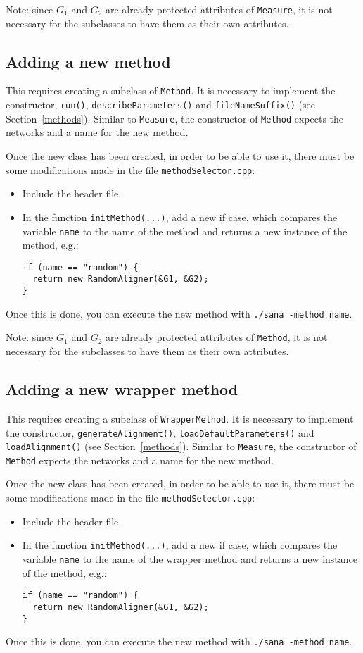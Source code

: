 \documentclass[]{article}
\begin{document}
Note: since $G_1$ and $G_2$ are already protected attributes of \texttt{Measure}, it is not necessary for the subclasses to have them as their own attributes.

\subsection{Adding a new method}
This requires creating a subclass of \texttt{Method}. It is necessary to implement the constructor, \texttt{run()}, \texttt{describeParameters()} and \texttt{fileNameSuffix()} (see Section~\ref{methods}). Similar to \texttt{Measure}, the constructor of \texttt{Method} expects the networks and a name for the new method.

Once the new class has been created, in order to be able to use it, there must be some modifications made in the file \texttt{methodSelector.cpp}:
\begin{itemize}
\item Include the header file.
\item In the function \texttt{initMethod(...)}, add a new if case, which compares the variable \texttt{name} to the name of the method and returns a new instance of the method, e.g.:
\begin{verbatim}
if (name == "random") {
  return new RandomAligner(&G1, &G2);
}
\end{verbatim}
\end{itemize}
Once this is done, you can execute the new method with \texttt{./sana -method name}.

Note: since $G_1$ and $G_2$ are already protected attributes of \texttt{Method}, it is not necessary for the subclasses to have them as their own attributes.

\subsection{Adding a new wrapper method}
This requires creating a subclass of \texttt{WrapperMethod}. It is necessary to implement the constructor, \texttt{generateAlignment()}, \texttt{loadDefaultParameters()} and \texttt{loadAlignment()} (see Section~\ref{methods}). Similar to \texttt{Measure}, the constructor of \texttt{Method} expects the networks and a name for the new method.

Once the new class has been created, in order to be able to use it, there must be some modifications made in the file \texttt{methodSelector.cpp}:
\begin{itemize}
\item Include the header file.
\item In the function \texttt{initMethod(...)}, add a new if case, which compares the variable \texttt{name} to the name of the wrapper method and returns a new instance of the method, e.g.:
\begin{verbatim}
if (name == "random") {
  return new RandomAligner(&G1, &G2);
}
\end{verbatim}
\end{itemize}
Once this is done, you can execute the new method with \texttt{./sana -method name}.
\end{document}
